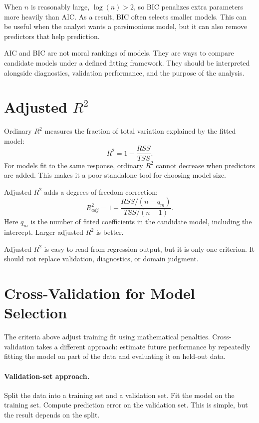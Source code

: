 When \(n\) is reasonably large, \(\log(n)>2\), so BIC penalizes extra parameters more heavily than AIC.  As a result, BIC often selects smaller models.  This can be useful when the analyst wants a parsimonious model, but it can also remove predictors that help prediction.

AIC and BIC are not moral rankings of models.  They are ways to compare candidate models under a defined fitting framework.  They should be interpreted alongside diagnostics, validation performance, and the purpose of the analysis.

\section[Adjusted R squared]{Adjusted \texorpdfstring{\(R^2\)}{R-squared}}

Ordinary \(R^2\) measures the fraction of total variation explained by the fitted model:
\begin{equation}
  R^2=1-\frac{RSS}{TSS}.
\end{equation}
For models fit to the same response, ordinary \(R^2\) cannot decrease when predictors are added.  This makes it a poor standalone tool for choosing model size.

Adjusted \(R^2\) adds a degrees-of-freedom correction:
\begin{equation}
  \boxed{
  R^2_{adj}
  =1-\frac{RSS/(n-q_m)}{TSS/(n-1)}.
  }
  \label{eq:ch15-adjusted-r2}
\end{equation}
Here \(q_m\) is the number of fitted coefficients in the candidate model, including the intercept.  Larger adjusted \(R^2\) is better.

Adjusted \(R^2\) is easy to read from regression output, but it is only one criterion.  It should not replace validation, diagnostics, or domain judgment.

\section{Cross-Validation for Model Selection}

The criteria above adjust training fit using mathematical penalties.  Cross-validation takes a different approach: estimate future performance by repeatedly fitting the model on part of the data and evaluating it on held-out data.

\paragraph{Validation-set approach.}
Split the data into a training set and a validation set.  Fit the model on the training set.  Compute prediction error on the validation set.  This is simple, but the result depends on the split.

